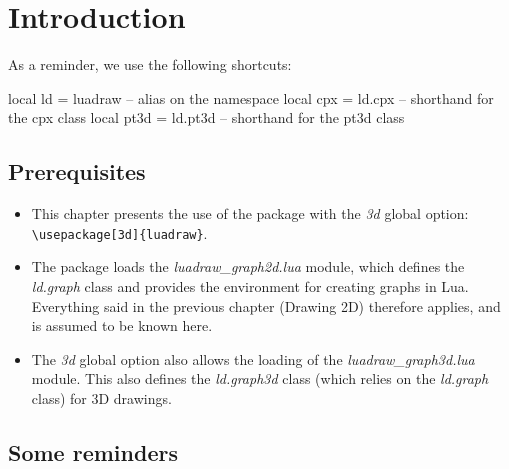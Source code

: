\section{Introduction}

As a reminder, we use the following shortcuts:

\begin{Luacode}
local ld = luadraw -- alias on the namespace
local cpx = ld.cpx -- shorthand for the cpx class
local pt3d = ld.pt3d -- shorthand for the pt3d class
\end{Luacode}

\subsection{Prerequisites}

\begin{itemize}
    \item This chapter presents the use of the \luadrawenv package with the \emph{3d} global option:
\verb|\usepackage[3d]{luadraw}|.
    \item The package loads the \emph{luadraw\_graph2d.lua} module, which defines the \emph{ld.graph} class and provides the \luadrawenv environment for creating graphs in Lua. Everything said in the previous chapter (Drawing 2D) therefore applies, and is assumed to be known here.
    \item The \emph{3d} global option also allows the loading of the \emph{luadraw\_graph3d.lua} module. This also defines the \emph{ld.graph3d} class (which relies on the \emph{ld.graph} class) for 3D drawings.
\end{itemize}

\subsection{Some reminders}

